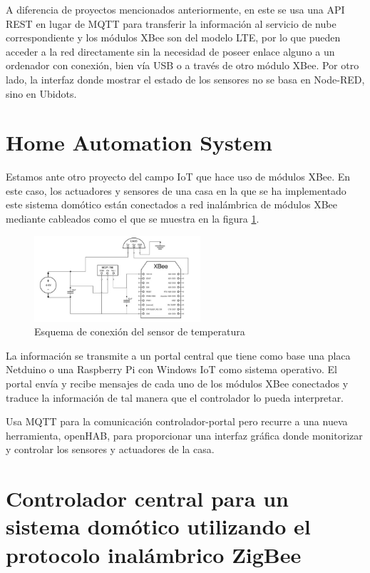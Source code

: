 A diferencia de proyectos mencionados anteriormente, en este se usa una API REST en lugar de MQTT para transferir la información al servicio de nube correspondiente y los módulos XBee son del modelo LTE, por lo que pueden acceder a la red directamente sin la necesidad de poseer enlace alguno a un ordenador con conexión, bien vía USB o a través de otro módulo XBee. Por otro lado, la interfaz donde mostrar el estado de los sensores no se basa en Node-RED, sino en Ubidots.

\section{Home Automation System \cite{Molnar:Digi}}

Estamos ante otro proyecto del campo IoT que hace uso de módulos XBee. En este caso, los actuadores y sensores de una casa en la que se ha implementado este sistema domótico están conectados a red inalámbrica de módulos XBee mediante cableados como el que se muestra en la figura \ref{fig:EArte5}.

\begin{figure}[tb]
\centering
\includegraphics[width=0.55\textwidth]{figuras/EArte5.png}
\caption{Esquema de conexión del sensor de temperatura}
\label{fig:EArte5}
\end{figure}

La información se transmite a un portal central que tiene como base una placa Netduino o una Raspberry Pi con Windows IoT como sistema operativo. El portal envía y recibe mensajes de cada uno de los módulos XBee conectados y traduce la información de tal manera que el controlador lo pueda interpretar.

Usa MQTT para la comunicación controlador-portal pero recurre a una nueva herramienta, openHAB, para proporcionar una interfaz gráfica donde monitorizar y controlar los sensores y actuadores de la casa.

\section{Controlador central para un sistema domótico utilizando el protocolo inalámbrico ZigBee \cite{ULL:2016}}

